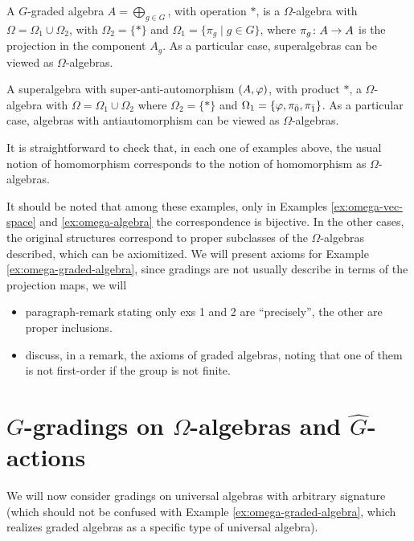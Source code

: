\begin{ex}\label{ex:omega-graded-algebra}
    A $G$-graded algebra $A = \bigoplus_{g\in G}$, with operation $*$, is a $\Omega$-algebra with $\Omega = \Omega_1 \cup \Omega_2$, with $\Omega_2 = \{ * \}$ and $\Omega_1 = \{ \pi_g \mid g\in G\}$, where $\pi_g\colon A \to A$ is the projection in the component $A_g$. 
    As a particular case, superalgebras can be viewed as $\Omega$-algebras.
\end{ex}

\begin{ex}
    A superalgebra with super-anti-automorphism $(A, \varphi)$, with product $*$, a $\Omega$-algebra with $\Omega = \Omega_1 \cup \Omega_2$ where $\Omega_2 = \{ * \}$ and $\Omega_1 = \{ \varphi, \pi_{\bar 0}, \pi_{\bar 1} \}$. 
    As a particular case, algebras with antiautomorphism can be viewed as $\Omega$-algebras.
\end{ex}

It is straightforward to check that, in each one of examples above, the usual notion of homomorphism corresponds to the notion of homomorphism as $\Omega$-algebras.

It should be noted that among these examples, only in Examples \ref{ex:omega-vec-space} and \ref{ex:omega-algebra} the correspondence is bijective. 
In the other cases, the original structures correspond to proper subclasses of the $\Omega$-algebras described, which can be axiomitized. 
We will present axioms for Example \ref{ex:omega-graded-algebra}, since gradings are not usually describe in terms of the projection maps, we will

\begin{itemize}
    \item[\done] paragraph-remark stating only exs 1 and 2 are ``precisely'', the other are proper inclusions.
    \item discuss, in a remark, the axioms of graded algebras, noting that one of them is not first-order if the group is not finite.
\end{itemize}

\section{$G$-gradings on $\Omega$-algebras and $\widehat G$-actions}

We will now consider gradings on universal algebras with arbitrary signature (which should not be confused with Example \ref{ex:omega-graded-algebra}, which realizes graded algebras as a specific type of universal algebra).

